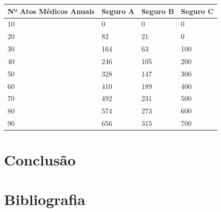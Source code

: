 \documentclass[10pt,a4paper]{article}
\begin{document}
\begin{table}[!ht]
    \centering
    \begin{tabular}{|l|l|l|l|}
    \hline
        Nº Atos Médicos Anuais & Seguro A & Seguro B & Seguro C \\ \hline
        10 & 0 & 0 & 0\\ \hline
        20 & 82 & 21 & 0  \\ \hline
        30 & 164 & 63 & 100  \\ \hline
        40 & 246 & 105 & 200 \\ \hline
        50 & 328 & 147 & 300 \\ \hline
        60 & 410 & 189 & 400  \\ \hline
        70 & 492 & 231 & 500 \\ \hline
        80 & 574 & 273 & 600 \\ \hline
        90 & 656 & 315 & 700  \\ \hline
    \end{tabular}
\end{table}


\section{Conclusão}

\newpage

\section{Bibliografia}


\printindex
\end{document}
